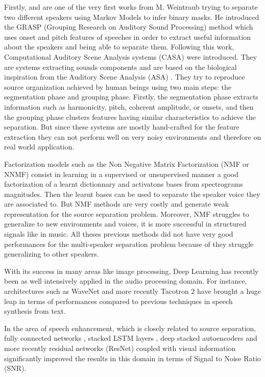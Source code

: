 \documentclass[master, tikz, final,11pt, dvipdfmx]{iscs-thesis}
\begin{document}
Firstly, \cite{Weintraub:1985:TCM:912498} and \cite{GRASP} are one of the very first works from M. Weintraub trying to separate two different speakers using Markov Models to infer binary masks. He introduced the GRASP (Grouping Research on Auditory Sound Processing) method which uses onset and pitch features of speeches in order to extract useful information about the speakers and being able to separate them.
Following this work, Computational Auditory Scene Analysis systems (CASA) \cite{CASA1, CASA2} were introduced. They are systems extracting sounds components and are based on the biological inspiration from the Auditory Scene Analysis (ASA) \cite{ASA}. They try to reproduce source organization achieved by human beings using two main steps: the segmentation phase and grouping phase. Firstly, the segmentation phase extracts information such as harmonicity, pitch, coherent amplitude, or onsets, and then the grouping phase clusters features having similar characteristics to achieve the separation. But since these systems are mostly hand-crafted for the feature extraction they can not perform well on very noisy environments and therefore on real world application. 

Factorization models such as the Non Negative Matrix Factorization \cite{SNMF, NMFalgo} (NMF or NNMF) consist in learning in a supervised or unsupervised manner a good factorization of a learnt dictionnary and activatons bases from spectrograms magnitudes. Then the learnt bases can be used to separate the speaker voice they are associated to. But NMF methods are very costly and generate weak representation for the source separation problem. Moreover, NMF struggles to generalize to new environments and voices, it is more successful in structured signals like in music.
All theses previous methods did not have very good performances for the multi-speaker separation problem because of they struggle generalizing to other speakers.

With its success in many areas like image processing, Deep Learning has recently been as well intensively applied in the audio processing domain. For instance, architectures such as WaveNet \cite{WaveNet} and more recently Tacotron 2 \cite{Tacotron2} have brought a huge leap in terms of performances compared to previous techniques in speech synthesis from text.

In the area of speech enhancement, which is closely related to source separation, fully connected networks \cite{DLSS}, stacked LSTM layers \cite{SELSTM, DAVSE}, deep stacked autoencoders \cite{AESE} and more recently residual networks (ResNet) coupled with visual information \cite{SpeechEnh} significantly improved the results in this domain in terms of Signal to Noise Ratio (SNR).
\end{document}
